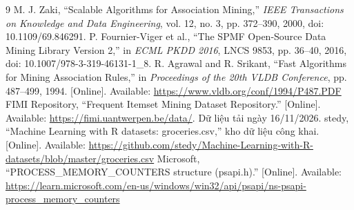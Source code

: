 \documentclass[conference,a4paper]{IEEEtran}
\begin{document}
\raggedbottom
\setcounter{section}{1}


\newpage
\begin{thebibliography}{9}
 M. J. Zaki, ``Scalable Algorithms for Association Mining,'' \emph{IEEE Transactions on Knowledge and Data Engineering}, vol. 12, no. 3, pp. 372--390, 2000, doi: 10.1109/69.846291.
 P. Fournier-Viger et al., ``The SPMF Open-Source Data Mining Library Version 2,'' in \emph{ECML PKDD 2016}, LNCS 9853, pp. 36--40, 2016, doi: 10.1007/978-3-319-46131-1\_8.
 R. Agrawal and R. Srikant, ``Fast Algorithms for Mining Association Rules,'' in \emph{Proceedings of the 20th VLDB Conference}, pp. 487--499, 1994. [Online]. Available: \url{https://www.vldb.org/conf/1994/P487.PDF}
 FIMI Repository, ``Frequent Itemset Mining Dataset Repository.'' [Online]. Available: \url{https://fimi.uantwerpen.be/data/}. Dữ liệu tải ngày 16/11/2026.
 stedy, ``Machine Learning with R datasets: groceries.csv,'' kho dữ liệu công khai. [Online]. Available: \url{https://github.com/stedy/Machine-Learning-with-R-datasets/blob/master/groceries.csv}
 Microsoft, ``PROCESS\_MEMORY\_COUNTERS structure (psapi.h).'' [Online]. Available: \url{https://learn.microsoft.com/en-us/windows/win32/api/psapi/ns-psapi-process_memory_counters}
\end{thebibliography}
\onecolumn
\EclatBenchmarkAppendix
\end{document}
